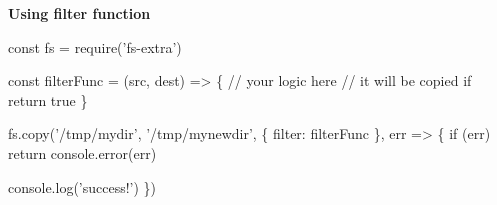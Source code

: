 {\bfseries Using filter function}


\begin{DoxyCode}
const fs = require('fs-extra')

const filterFunc = (src, dest) => \{
  // your logic here
  // it will be copied if return true
\}

fs.copy('/tmp/mydir', '/tmp/mynewdir', \{ filter: filterFunc \}, err => \{
  if (err) return console.error(err)

  console.log('success!')
\})
\end{DoxyCode}
 